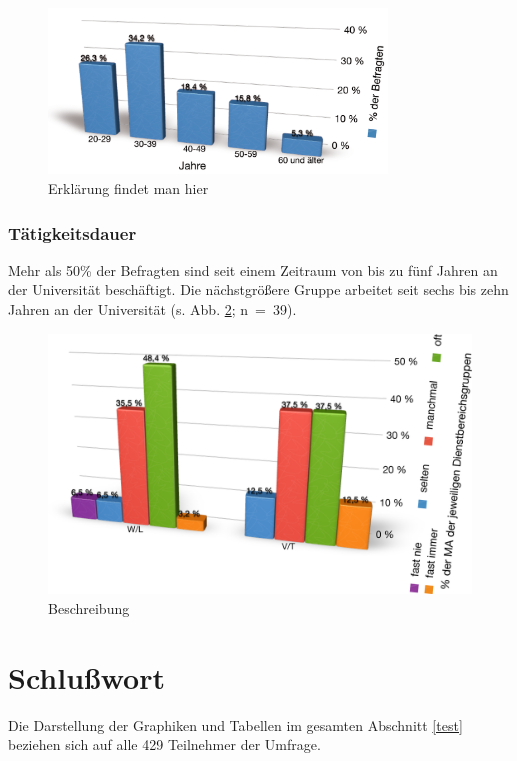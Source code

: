     \begin{figure}[ht]
      \centering
      \includegraphics[width=9cm]{bilder/bild2.png} 
      \caption{Erklärung findet man hier}
      \label{bild2}
    \end{figure}
    
    \subsubsection*{Tätigkeitsdauer}
    
    Mehr als 50\% der Befragten sind seit einem Zeitraum von bis zu fünf Jahren an der Universität beschäftigt. Die nächstgrößere Gruppe arbeitet seit sechs bis zehn Jahren an der Universität (s. Abb. \ref{bild3}; n~=~39). 
    
    \begin{figure}[h]
      \centering
      \includegraphics[width=12cm]{bilder/bild3.png} 
      \caption{Beschreibung}
      \label{bild3}
    \end{figure}

  \section{Schlußwort}
  \label{schluszwort}
  
  Die Darstellung der Graphiken und Tabellen im gesamten Abschnitt \ref{test} beziehen sich auf alle 429 Teilnehmer der Umfrage.
